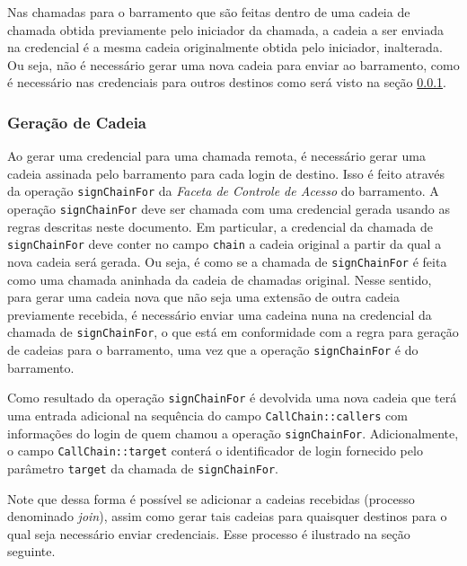 \documentclass[]{article}
\newcommand{\term}[1]{\textit{#1}}
\newcommand{\code}[1]{\texttt{#1}}
\begin{document}
Nas chamadas para o barramento que são feitas dentro de uma cadeia de chamada obtida previamente pelo iniciador da chamada, a cadeia a ser enviada na credencial é a mesma cadeia originalmente obtida pelo iniciador, inalterada.
Ou seja, não é necessário gerar uma nova cadeia para enviar ao barramento, como é necessário nas credenciais para outros destinos como será visto na seção \ref{sub:geracao_de_cadeia}.


\subsubsection{Geração de Cadeia} %
\label{sub:geracao_de_cadeia}

Ao gerar uma credencial para uma chamada remota, é necessário gerar uma cadeia assinada pelo barramento para cada login de destino.
Isso é feito através da operação \code{signChainFor} da \term{Faceta de Controle de Acesso} do barramento.
A operação \code{signChainFor} deve ser chamada com uma credencial gerada usando as regras descritas neste documento.
Em particular, a credencial da chamada de \code{signChainFor} deve conter no campo \code{chain} a cadeia original a partir da qual a nova cadeia será gerada.
Ou seja, é como se a chamada de \code{signChainFor} é feita como uma chamada aninhada da cadeia de chamadas original.
Nesse sentido, para gerar uma cadeia nova que não seja uma extensão de outra cadeia previamente recebida, é necessário enviar uma cadeina nuna na credencial da chamada de \code{signChainFor}, o que está em conformidade com a regra para geração de cadeias para o barramento, uma vez que a operação \code{signChainFor} é do barramento.

Como resultado da operação \code{signChainFor} é devolvida uma nova cadeia que terá uma entrada adicional na sequência do campo \code{CallChain::callers} com informações do login de quem chamou a operação \code{signChainFor}.
Adicionalmente, o campo \code{CallChain::target} conterá o identificador de login fornecido pelo parâmetro \code{target} da chamada de \code{signChainFor}.

Note que dessa forma é possível se adicionar a cadeias recebidas (processo denominado \term{join}), assim como gerar tais cadeias para quaisquer destinos para o qual seja necessário enviar credenciais.
Esse processo é ilustrado na seção seguinte.




%
%
\end{document}

